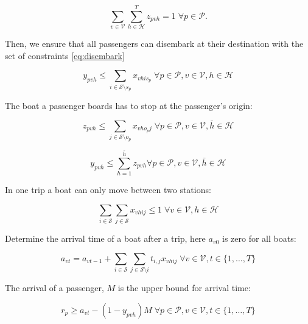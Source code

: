 \documentclass[12pt]{elsarticle}
\begin{document}
\begin{equation}
  \label{eq:embark}
  \sum_{v \in \mathcal{V}}  \sum_{h \in \mathcal{H}}^{T} z_{pvh} = 1 \;\forall p \in \mathcal{P}.
\end{equation}

Then, we ensure that all passengers can disembark at their destination with
the set of constraints \eqref{eq:disembark}

\begin{equation}
  \label{eq:disembark}
  y_{pvh} \leq \sum_{i \in \mathcal{S}  \setminus s_p} x_{vhis_p} \;
  \forall p \in \mathcal{P}, v \in \mathcal{V},  h \in \mathcal{H}
\end{equation}

The boat a passenger boards has to stop at the passenger's
origin:

\begin{equation}
  \label{eq:stoporgn}
  z_{pvh} \leq \sum_{j \in \mathcal{S}  \setminus o_p}
  x_{vho_pj} \; \forall p \in \mathcal{P},  v \in
  \mathcal{V}, \bar h \in \mathcal{H}
\end{equation}

\begin{equation}
  \label{eq:onetrip}
  y_{pv\bar h} \le \sum_{h = 1}^{\bar h}  z_{pvh}  \forall p \in \mathcal{P}, v \in \mathcal{V},  \bar h \in \mathcal{H}
\end{equation}


In one trip a boat can only move between two stations:

\begin{equation}
  \label{eq:onetrip}
  \sum_{i \in \mathcal{S}} \sum_{j \in \mathcal{S}} x_{vhij} \le 1 \;
  \forall v \in \mathcal{V},  h \in \mathcal{H}
\end{equation}

Determine the arrival time of a boat after a trip, here $a_{v0}$ is
zero for all boats:

\begin{equation}
  \label{eq:arrivaltimevessel}
  a_{vt} = a_{vt-1} + \sum_{i \in \mathcal{S}} \sum_{j \in
    \mathcal{S}\setminus i} t_{i,j}x_{vhij} \; \forall v \in
  \mathcal{V}, t \in \{1,\dots,T\}
\end{equation}

The arrival of a passenger, $M$ is the upper bound for arrival time:

\begin{equation}
  \label{eq:arrivaltimepassenger}
  r_p \ge a_{vt} - (1 - y_{pvh})M \; \forall p \in \mathcal{P}, v \in
  \mathcal{V}, t \in \{1,\dots,T\}
\end{equation}
\end{document}
